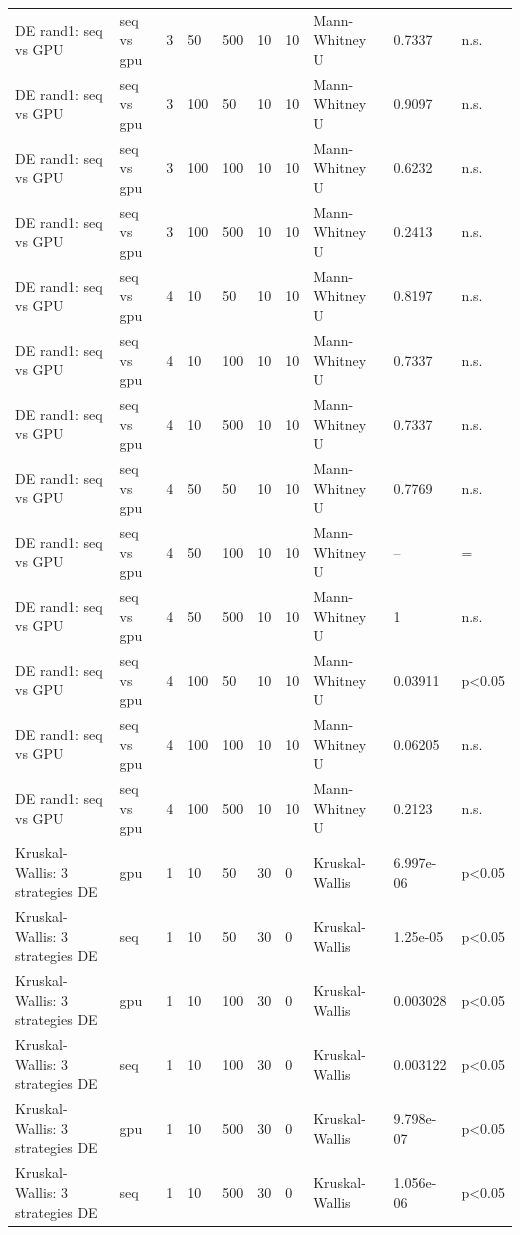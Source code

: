 \begin{table}[t]
\begin{tabular}{llllllllll}
DE rand1: seq vs GPU & seq vs gpu & 3 & 50 & 500 & 10 & 10 & Mann-Whitney U & 0.7337 & n.s. \\
DE rand1: seq vs GPU & seq vs gpu & 3 & 100 & 50 & 10 & 10 & Mann-Whitney U & 0.9097 & n.s. \\
DE rand1: seq vs GPU & seq vs gpu & 3 & 100 & 100 & 10 & 10 & Mann-Whitney U & 0.6232 & n.s. \\
DE rand1: seq vs GPU & seq vs gpu & 3 & 100 & 500 & 10 & 10 & Mann-Whitney U & 0.2413 & n.s. \\
DE rand1: seq vs GPU & seq vs gpu & 4 & 10 & 50 & 10 & 10 & Mann-Whitney U & 0.8197 & n.s. \\
DE rand1: seq vs GPU & seq vs gpu & 4 & 10 & 100 & 10 & 10 & Mann-Whitney U & 0.7337 & n.s. \\
DE rand1: seq vs GPU & seq vs gpu & 4 & 10 & 500 & 10 & 10 & Mann-Whitney U & 0.7337 & n.s. \\
DE rand1: seq vs GPU & seq vs gpu & 4 & 50 & 50 & 10 & 10 & Mann-Whitney U & 0.7769 & n.s. \\
DE rand1: seq vs GPU & seq vs gpu & 4 & 50 & 100 & 10 & 10 & Mann-Whitney U & -- & = \\
DE rand1: seq vs GPU & seq vs gpu & 4 & 50 & 500 & 10 & 10 & Mann-Whitney U & 1 & n.s. \\
DE rand1: seq vs GPU & seq vs gpu & 4 & 100 & 50 & 10 & 10 & Mann-Whitney U & 0.03911 & p<0.05 \\
DE rand1: seq vs GPU & seq vs gpu & 4 & 100 & 100 & 10 & 10 & Mann-Whitney U & 0.06205 & n.s. \\
DE rand1: seq vs GPU & seq vs gpu & 4 & 100 & 500 & 10 & 10 & Mann-Whitney U & 0.2123 & n.s. \\
Kruskal-Wallis: 3 strategies DE & gpu & 1 & 10 & 50 & 30 & 0 & Kruskal-Wallis & 6.997e-06 & p<0.05 \\
Kruskal-Wallis: 3 strategies DE & seq & 1 & 10 & 50 & 30 & 0 & Kruskal-Wallis & 1.25e-05 & p<0.05 \\
Kruskal-Wallis: 3 strategies DE & gpu & 1 & 10 & 100 & 30 & 0 & Kruskal-Wallis & 0.003028 & p<0.05 \\
Kruskal-Wallis: 3 strategies DE & seq & 1 & 10 & 100 & 30 & 0 & Kruskal-Wallis & 0.003122 & p<0.05 \\
Kruskal-Wallis: 3 strategies DE & gpu & 1 & 10 & 500 & 30 & 0 & Kruskal-Wallis & 9.798e-07 & p<0.05 \\
Kruskal-Wallis: 3 strategies DE & seq & 1 & 10 & 500 & 30 & 0 & Kruskal-Wallis & 1.056e-06 & p<0.05 \\

\end{tabular}
\end{table}

